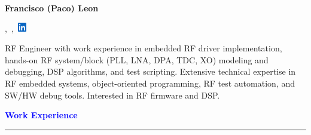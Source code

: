 \documentclass[10pt, letterpaper]{letter}
\begin{document}

\vfill

\begin{center}

    \LARGE \textbf{Francisco (Paco) Leon}\vspace{8pt}\\
    \large

    \href{mailto:\myemail}{\myemail},\ \myphone,\
    \href{https://www.linkedin.com/in/francisco-leon-ab8178127/}
    {\includegraphics[width=11pt]{in.png}}\\
    \myaddress

\end{center}

\vfill


RF Engineer with work experience in embedded RF driver implementation, hands-on RF system/block (PLL, LNA, DPA, TDC, XO) modeling and debugging, DSP algorithms, and test scripting. Extensive technical expertise in RF embedded systems, object-oriented programming, RF test automation, and SW/HW debug tools. Interested in RF firmware and DSP.

\vfill


\textcolor{Blue}{
    \large\textbf{Work Experience}
    \vspace{1pt} %
    \hrule height 1.5pt
}
\end{document}
